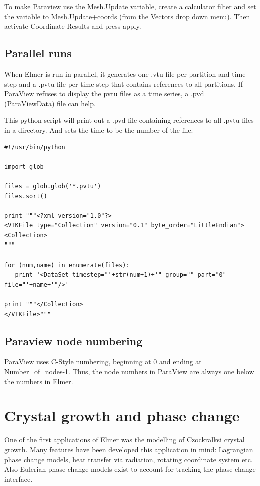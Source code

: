 To make Paraview use the Mesh.Update variable, create a calculator filter and set the variable to Mesh.Update+coords (from the Vectors drop down menu). Then activate Coordinate Results and press apply. 

\subsection{Parallel runs}

When Elmer is run in parallel, it generates one .vtu file per partition and time step and a .pvtu file per time step that contains references to all partitions. If ParaView refuses to display the pvtu files as a time series, a .pvd (ParaViewData) file can help.

This python script will print out a .pvd file containing references to all .pvtu files in a directory. And sets the time to be the number of the file.

\begin{verbatim}
#!/usr/bin/python

import glob

files = glob.glob('*.pvtu')
files.sort()

print """<?xml version="1.0"?>
<VTKFile type="Collection" version="0.1" byte_order="LittleEndian">
<Collection>
"""

for (num,name) in enumerate(files):
   print '<DataSet timestep="'+str(num+1)+'" group="" part="0" file="'+name+'"/>'

print """</Collection>
</VTKFile>"""
\end{verbatim}

\subsection{Paraview node numbering}

ParaView uses C-Style numbering, beginning at 0 and ending at Number\_of\_nodes-1. Thus, the node numbers in ParaView are always one below the numbers in Elmer. 

\section{Crystal growth and phase change}

One of the first applications of Elmer was the modelling of Czockralksi crystal growth. Many features have been developed this application in mind: Lagrangian phase change models, heat transfer via radiation, rotating coordinate system etc. Also Eulerian phase change models exist to account for tracking the phase change interface.\\

